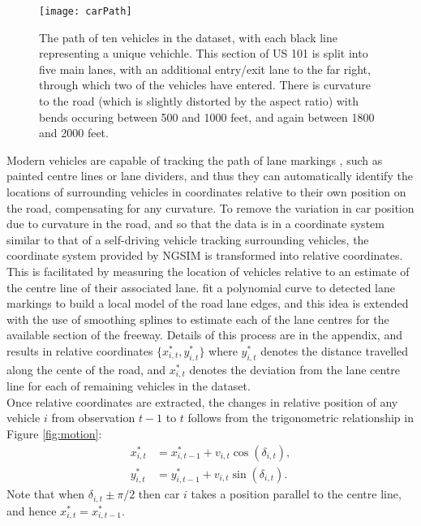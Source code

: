 \documentclass[12pt,a4paper]{article}\usepackage[]{graphicx}\usepackage[]{color}
\begin{document}
\begin{figure}
\centering
\texttt{[image: carPath]}
\caption{The path of ten vehicles in the dataset, with each black line representing a unique vehichle. This section of US 101 is split into five main lanes, with an additional entry/exit lane to the far right, through which two of the vehicles have entered. There is curvature to the road (which is slightly distorted by the aspect ratio) with bends occuring between 500 and 1000 feet, and again between 1800 and 2000 feet.}
\label{fig:rawData}
\end{figure}

Modern vehicles are capable of tracking the path of lane markings \citep{Thuy2010}, such as painted centre lines or lane dividers, and thus they can automatically identify the locations of surrounding vehicles in coordinates relative to their own position on the road, compensating for any curvature. To remove the variation in car position due to curvature in the road, and so that the data is in a coordinate system similar to that of a self-driving vehicle tracking surrounding vehicles, the coordinate system provided by NGSIM is transformed into relative coordinates. This is facilitated by measuring the location of vehicles relative to an estimate of the centre line of their associated lane. \citet{Woo2016a} fit a polynomial curve to detected lane markings to build a local model of the road lane edges, and this idea is extended with the use of smoothing splines to estimate each of the lane centres for the available section of the freeway. Details of this process are in the appendix, and results in relative coordinates $\{x^*_{i, t}, y^*_{i, t}\}$  where $y^*_{i, t}$ denotes the distance travelled along the cente of the road, and $x^*_{i, t}$ denotes the deviation from the lane centre line for each of remaining vehicles in the dataset.
\\

Once relative coordinates are extracted, the changes in relative position of any vehicle $i$ from observation $t-1$ to $t$ follows from the trigonometric relationship in Figure \ref{fig:motion}:
\begin{align}
x^*_{i, t} &= x^*_{i, t-1} + v_{i, t} \cos(\delta_{i, t}) \label{xEq}, \\
y^*_{i, t} &= y^*_{i, t-1} + v_{i, t} \sin(\delta_{i, t}) \label{yEq}.
\end{align}
Note that when $\delta_{i, t} \pm \pi/2$ then car $i$ takes a position parallel to the centre line, and hence $x^*_{i, t} = x^*_{i, t-1}$.
\\
\end{document}
